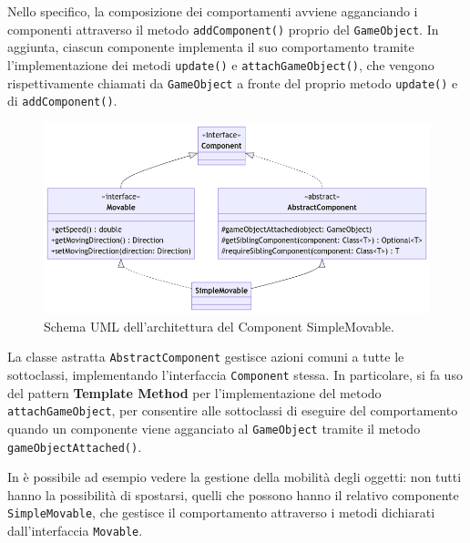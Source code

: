 \documentclass[a4paper,12pt]{report}
\begin{document}
Nello specifico, la composizione dei comportamenti avviene agganciando i componenti attraverso il metodo \texttt{addComponent()} proprio del \texttt{GameObject}. In aggiunta, ciascun componente implementa il suo comportamento tramite l'implementazione dei metodi \texttt{update()} e \texttt{attachGameObject()}, che vengono rispettivamente chiamati da \texttt{GameObject} a fronte del proprio metodo \texttt{update()} e di \texttt{addComponent()}.
%
\begin{figure}
    \centering{}
    \includegraphics[width=\textwidth]{img/SimpleMovable.png}
    \caption{Schema UML dell'architettura del Component SimpleMovable.}
    \label{fig:simple-movable}
\end{figure}
%

La classe astratta \texttt{AbstractComponent} gestisce azioni comuni a tutte le sottoclassi, implementando l'interfaccia \texttt{Component} stessa. In particolare, si fa uso del pattern \textbf{Template Method} per l'implementazione del metodo \texttt{attachGameObject}, per consentire alle sottoclassi di eseguire del comportamento quando un componente viene agganciato al \texttt{GameObject} tramite il metodo \texttt{gameObjectAttached()}.

In  è possibile ad esempio vedere la gestione della mobilità degli oggetti: non tutti hanno la possibilità di spostarsi, quelli che possono hanno il relativo componente \texttt{SimpleMovable}, che gestisce il comportamento attraverso i metodi dichiarati dall'interfaccia \texttt{Movable}.
%
\newpage
%
\end{document}
